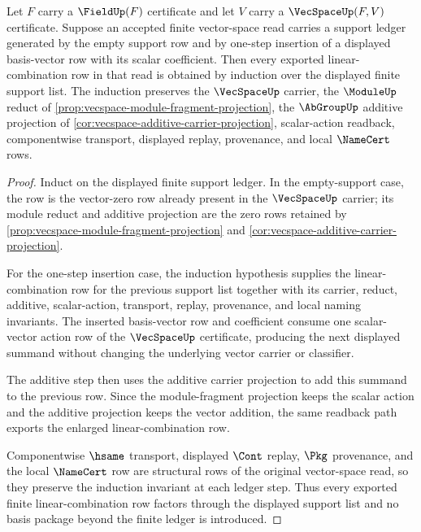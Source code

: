 \begin{theorem}
\label{thm:vecspace-finite-linear-combination-induction-route}
Let $F$ carry a $\FieldUp(F)$ certificate and let $V$ carry a $\VecSpaceUp(F,V)$ certificate. Suppose an accepted finite vector-space read carries a support ledger generated by the empty support row and by one-step insertion of a displayed basis-vector row with its scalar coefficient. Then every exported linear-combination row in that read is obtained by induction over the displayed finite support list. The induction preserves the $\VecSpaceUp$ carrier, the $\ModuleUp$ reduct of \autoref{prop:vecspace-module-fragment-projection}, the $\AbGroupUp$ additive projection of \autoref{cor:vecspace-additive-carrier-projection}, scalar-action readback, componentwise transport, displayed replay, provenance, and local $\NameCert$ rows.
\end{theorem}
\begin{proof}
Induct on the displayed finite support ledger. In the empty-support case, the row is the vector-zero row already present in the $\VecSpaceUp$ carrier; its module reduct and additive projection are the zero rows retained by \autoref{prop:vecspace-module-fragment-projection} and \autoref{cor:vecspace-additive-carrier-projection}.

For the one-step insertion case, the induction hypothesis supplies the linear-combination row for the previous support list together with its carrier, reduct, additive, scalar-action, transport, replay, provenance, and local naming invariants. The inserted basis-vector row and coefficient consume one scalar-vector action row of the $\VecSpaceUp$ certificate, producing the next displayed summand without changing the underlying vector carrier or classifier.

The additive step then uses the additive carrier projection to add this summand to the previous row. Since the module-fragment projection keeps the scalar action and the additive projection keeps the vector addition, the same readback path exports the enlarged linear-combination row.

Componentwise $\hsame$ transport, displayed $\Cont$ replay, $\Pkg$ provenance, and the local $\NameCert$ row are structural rows of the original vector-space read, so they preserve the induction invariant at each ledger step. Thus every exported finite linear-combination row factors through the displayed support list and no basis package beyond the finite ledger is introduced.
\end{proof}
